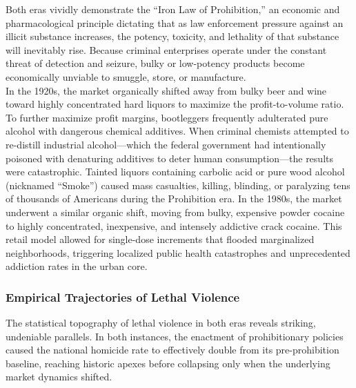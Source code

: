 \documentclass[
]{article}
\begin{document}
Both eras vividly demonstrate the ``Iron Law of Prohibition,'' an
economic and pharmacological principle dictating that as law enforcement
pressure against an illicit substance increases, the potency, toxicity,
and lethality of that substance will inevitably rise. Because criminal
enterprises operate under the constant threat of detection and seizure,
bulky or low-potency products become economically unviable to smuggle,
store, or manufacture.\\
In the 1920s, the market organically shifted away from bulky beer and
wine toward highly concentrated hard liquors to maximize the
profit-to-volume ratio. To further maximize profit margins, bootleggers
frequently adulterated pure alcohol with dangerous chemical additives.
When criminal chemists attempted to re-distill industrial
alcohol---which the federal government had intentionally poisoned with
denaturing additives to deter human consumption---the results were
catastrophic. Tainted liquors containing carbolic acid or pure wood
alcohol (nicknamed ``Smoke'') caused mass casualties, killing, blinding,
or paralyzing tens of thousands of Americans during the Prohibition era.
In the 1980s, the market underwent a similar organic shift, moving from
bulky, expensive powder cocaine to highly concentrated, inexpensive, and
intensely addictive crack cocaine. This retail model allowed for
single-dose increments that flooded marginalized neighborhoods,
triggering localized public health catastrophes and unprecedented
addiction rates in the urban core.

\subsubsection{\texorpdfstring{\textbf{Empirical Trajectories of Lethal
Violence}}{Empirical Trajectories of Lethal Violence}}\label{empirical-trajectories-of-lethal-violence}

The statistical topography of lethal violence in both eras reveals
striking, undeniable parallels. In both instances, the enactment of
prohibitionary policies caused the national homicide rate to effectively
double from its pre-prohibition baseline, reaching historic apexes
before collapsing only when the underlying market dynamics shifted.
\end{document}
